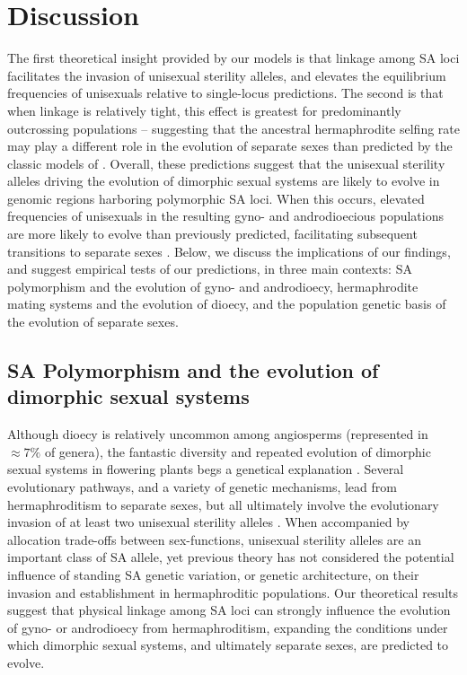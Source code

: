 \documentclass[9pt,twocolumn,twoside,lineno]{gsajnl}
\begin{document}
\section{Discussion}

The first theoretical insight provided by our models is that linkage among SA loci facilitates the invasion of unisexual sterility alleles, and elevates the equilibrium frequencies of unisexuals relative to single-locus predictions. The second is that when linkage is relatively tight, this effect is greatest for predominantly outcrossing populations -- suggesting that the ancestral hermaphrodite selfing rate may play a different role in the evolution of separate sexes than predicted by the classic models of \citep{Charlesworth1978a}. Overall, these predictions suggest that the unisexual sterility alleles driving the evolution of dimorphic sexual systems are likely to evolve in genomic regions harboring polymorphic SA loci. When this occurs, elevated frequencies of unisexuals in the resulting gyno- and androdioecious populations are more likely to evolve than previously predicted, facilitating subsequent transitions to separate sexes \citep{Charlesworth1978a}. Below, we discuss the implications of our findings, and suggest empirical tests of our predictions, in three main contexts: SA polymorphism and the evolution of gyno- and androdioecy, hermaphrodite mating systems and the evolution of dioecy, and the population genetic basis of the evolution of separate sexes.

\subsection{SA Polymorphism and the evolution of dimorphic sexual systems}

Although dioecy is relatively uncommon among angiosperms (represented in $\approx 7\%$ of genera), the fantastic diversity and repeated evolution of dimorphic sexual systems in flowering plants begs a genetical explanation \citep{Renner2014,KaferPannell2017}. Several evolutionary pathways, and a variety of genetic mechanisms, lead from hermaphroditism to separate sexes, but all ultimately involve the evolutionary invasion of at least two unisexual sterility alleles \citep{Charlesworth1978a,Charlesworth1978b,Renner2014,Ashman2015}. When accompanied by allocation trade-offs between sex-functions, unisexual sterility alleles are an important class of SA allele, yet previous theory has not considered the potential influence of standing SA genetic variation, or genetic architecture, on their invasion and establishment in hermaphroditic populations. Our theoretical results suggest that physical linkage among SA loci can strongly influence the evolution of gyno- or androdioecy from hermaphroditism, expanding the conditions under which dimorphic sexual systems, and ultimately separate sexes, are predicted to evolve. 
\end{document}
